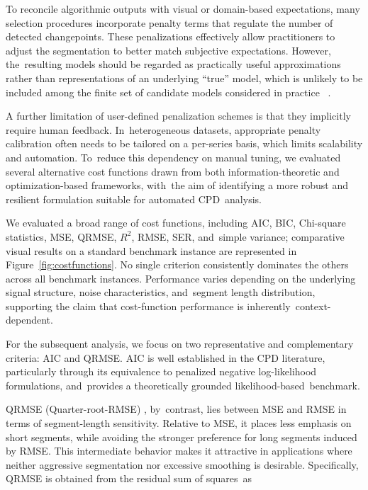 \documentclass[mathematics,article,accept,pdftex,moreauthors]{Definitions/mdpi}
\begin{document}
To reconcile algorithmic outputs with visual or domain-based expectations, many selection procedures incorporate penalty terms that regulate the number of detected changepoints. These penalizations effectively allow practitioners to adjust the segmentation to better match subjective expectations. However, the~resulting models should be regarded as practically useful approximations rather than representations of an underlying “true” model, which is unlikely to be included among the finite set of candidate models considered in practice %
~\cite{HRFB13}.

A further limitation of user-defined penalization schemes is that they implicitly require human feedback. In~heterogeneous datasets, appropriate penalty calibration often needs to be tailored on a per-series basis, which limits scalability and automation. To~reduce this dependency on manual tuning, we evaluated several alternative cost functions drawn from both information-theoretic and optimization-based frameworks, with~the aim of identifying a more robust and resilient formulation suitable for automated CPD~analysis.

We evaluated a broad range of cost functions, including AIC, BIC, Chi-square statistics, MSE, QRMSE, $R^2$, RMSE, SER, and~simple variance; comparative visual results on a standard benchmark instance are represented in Figure~\ref{fig:costfunctions}. No single criterion consistently dominates the others across all benchmark instances. Performance varies depending on the underlying signal structure, noise characteristics, and~segment length distribution, supporting the claim that cost-function performance is inherently~context-dependent.

For the subsequent analysis, we focus on two representative and complementary criteria: AIC and QRMSE. AIC is well established in the CPD literature, particularly through its equivalence to penalized negative log-likelihood formulations, and~provides a theoretically grounded likelihood-based~benchmark.

QRMSE (Quarter-root-RMSE) \cite{M24}, by~contrast, lies between MSE and RMSE in terms of segment-length sensitivity. Relative to MSE, it places less emphasis on short segments, while avoiding the stronger preference for long segments induced by RMSE. This intermediate behavior makes it attractive in applications where neither aggressive segmentation nor excessive smoothing is desirable.
Specifically, QRMSE is obtained from the residual sum of squares~as
\end{document}
